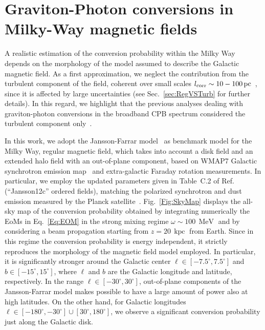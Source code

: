 \documentclass[twocolumn,superscriptaddress,floatfix,preprintnumbers, nofootinbib,hyperref]{revtex4-2}
\DeclareMathOperator{\MeV}{MeV}
\DeclareMathOperator{\kpc}{kpc}
\begin{document}
\section{Graviton-Photon conversions in Milky-Way magnetic fields}
\label{sec:MilkyWayConversions}
A realistic estimation of the conversion probability within the Milky Way depends on the morphology of the model assumed to describe the Galactic magnetic field. As a first approximation, we neglect the contribution from the turbulent component of the field, coherent over small scales $l_{\rm corr}\sim10-100\,{\rm pc}$~\cite{Iacobelli:2013fqa,Haverkorn:2008tb,10.1093/mnras/262.4.953,Carenza:2021alz}, since it is affected by large uncertainties (see Sec.~\ref{sec:RegVSTurb} for further details). In this regard, we highlight that the previous analyses dealing with graviton-photon conversions in the broadband CPB spectrum considered the turbulent component only~\cite{Ito:2023nkq}.

In this work, we adopt the Jansson-Farrar model~\cite{Jansson:2012pc} as benchmark model for the Milky Way, regular magnetic field, which takes into account a disk field and an extended halo field with an out-of-plane component, based on WMAP7 Galactic synchrotron emission map~\cite{Gold:2010fm} and extra-galactic Faraday rotation measurements. In particular, we employ the updated parameters given in Table~C.2 of Ref.~\cite{Planck:2016gdp}
(“Jansson12c” ordered fields), matching the polarized synchrotron and dust emission measured by the Planck satellite~\cite{Planck:2015mrs,Planck:2015qep,Planck:2015zry}. Fig.~\ref{Fig:SkyMap} displays the all-sky map of the conversion probability obtained by integrating numerically the EoMs in Eq.~\eqref{Eq:EOM} in the strong mixing regime $\omega\sim100\,\MeV$ and by considering a beam propagation starting from $z=20\,\kpc$ from Earth. Since in this regime the conversion probability is energy independent, it strictly reproduces the morphology of the magnetic field model employed. In particular, it is significantly stronger around the Galactic center $\ell\in[-7.5^{\circ},7.5^{\circ}]$ and $b\in[-15^{\circ},15^{\circ}]$, where $\ell$ and $b$ are the Galactic longitude and latitude, respectively. In the range $\ell\in[-30^{\circ},30^{\circ}]$, out-of-plane components of the Jansson-Farrar model makes possible to have a large amount of power also at high latitudes. On the other hand, for Galactic longitudes $\ell\in[-180^{\circ},-30^{\circ}]\cup[30^{\circ},180^\circ]$, we observe a significant conversion probability just along the Galactic disk.
\end{document}
